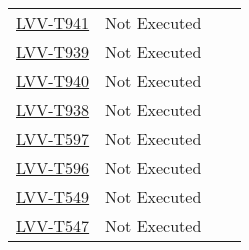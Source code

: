 \documentclass[DM,lsstdraft,STR,toc]{lsstdoc}
\begin{document}
\begin{longtable}{p{2cm}p{2.5cm}p{9cm}p{2.5cm}}
\begin{minipage}[]{9cm}
    \medskip
    \end{minipage}
    &
    \\\hline
\href{https://jira.lsstcorp.org/secure/Tests.jspa#/testCase/LVV-T941}{LVV-T941}
    & Not Executed &
    \begin{minipage}[]{9cm}
    \smallskip
    
    \medskip
    \end{minipage}
    &
    \\\hline
\href{https://jira.lsstcorp.org/secure/Tests.jspa#/testCase/LVV-T939}{LVV-T939}
    & Not Executed &
    \begin{minipage}[]{9cm}
    \smallskip
    
    \medskip
    \end{minipage}
    &
    \\\hline
\href{https://jira.lsstcorp.org/secure/Tests.jspa#/testCase/LVV-T940}{LVV-T940}
    & Not Executed &
    \begin{minipage}[]{9cm}
    \smallskip
    
    \medskip
    \end{minipage}
    &
    \\\hline
\href{https://jira.lsstcorp.org/secure/Tests.jspa#/testCase/LVV-T938}{LVV-T938}
    & Not Executed &
    \begin{minipage}[]{9cm}
    \smallskip
    
    \medskip
    \end{minipage}
    &
    \\\hline
\href{https://jira.lsstcorp.org/secure/Tests.jspa#/testCase/LVV-T597}{LVV-T597}
    & Not Executed &
    \begin{minipage}[]{9cm}
    \smallskip
    
    \medskip
    \end{minipage}
    &
    \\\hline
\href{https://jira.lsstcorp.org/secure/Tests.jspa#/testCase/LVV-T596}{LVV-T596}
    & Not Executed &
    \begin{minipage}[]{9cm}
    \smallskip
    
    \medskip
    \end{minipage}
    &
    \\\hline
\href{https://jira.lsstcorp.org/secure/Tests.jspa#/testCase/LVV-T549}{LVV-T549}
    & Not Executed &
    \begin{minipage}[]{9cm}
    \smallskip
    
    \medskip
    \end{minipage}
    &
    \\\hline
\href{https://jira.lsstcorp.org/secure/Tests.jspa#/testCase/LVV-T547}{LVV-T547}
    & Not Executed &
    \begin{minipage}[]{9cm}
    \smallskip
    

\end{minipage}
\end{longtable}
\end{document}

